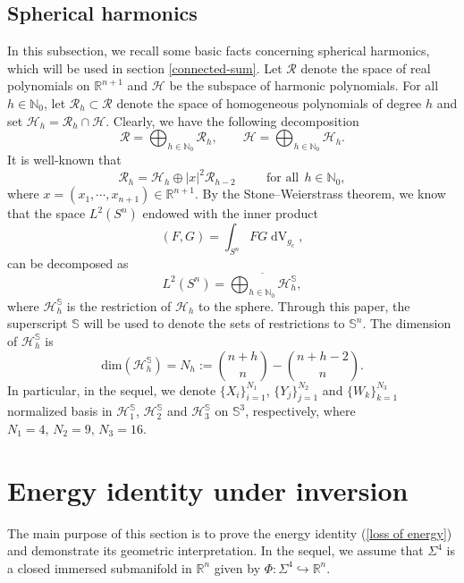 \documentclass[11pt,letterpaper]{amsart}
\DeclareMathOperator{\dvol}{dV}
\newcommand{\bN}{\mathbb{N}}
\newcommand{\bR}{\mathbb{R}}
\newcommand{\bS}{\mathbb{S}}
\theoremstyle{definition}
\theoremstyle{remark}
\numberwithin{equation}{section}
\begin{document}
\subsection{Spherical harmonics}
In  this subsection, we recall some basic facts concerning spherical harmonics, which will be used in section \ref{connected-sum}. Let $\mathcal{R}$ denote the space of real polynomials on $\bR^{n+1}$ and $\mathcal{H}$ be the subspace of harmonic polynomials. For all $h\in \bN_0$, let $\mathcal{R}_h\subset \mathcal{R}$ denote the space of homogeneous polynomials of degree $h$ and set $\mathcal{H}_h=\mathcal{R}_h\cap \mathcal{H}$. Clearly, we have the following decomposition
\begin{equation*}
    \mathcal{R}=\bigoplus_{h\in \bN_0}\mathcal{R}_h, \quad \quad \mathcal{H}=\bigoplus_{h\in \bN_0}\mathcal{H}_h.
\end{equation*}
It is well-known that 
\begin{equation}
    \mathcal{R}_h=\mathcal{H}_h\oplus |x|^2\mathcal{R}_{h-2} \quad \quad ~~\mbox{for all}~~ h\in \bN_0,
\end{equation}
where $x=(x_1,\cdots, x_{n+1})\in \bR^{n+1}$. 
By the Stone--Weierstrass theorem, we know that the space $L^2(S^{n})$ endowed with the inner product
\begin{equation*}
    (F,G)=\int_{S^{n}}FG\dvol_{g_c},
\end{equation*}
can be decomposed as 
\begin{equation*}
    L^2(S^{n})=\overline{\bigoplus_{h\in\bN_0}\mathcal{H}^{\bS}_{h}},
\end{equation*} 
where $\mathcal{H}^{\bS}_{h}$ is the restriction of $\mathcal{H}_{h}$ to the sphere. 
Through this paper, the superscript $\bS$ will be used to denote the sets of restrictions to $\mathbb{S}^{n}$. The dimension of $\mathcal{H}^{\bS}_{h}$ is 
\begin{equation*}
    \mathrm{dim} (\mathcal{H}^{\bS}_{h})=N_{h}:=\binom{n+h}{n}-\binom{n+h-2}{n}.
\end{equation*}
In particular, in the sequel, we denote $\{X_i\}_{i=1}^{N_1}$, $\{Y_j\}_{j=1}^{N_2}$ and $\{W_k\}_{k=1}^{N_3}$ normalized basis in $\mathcal{H}^{\bS}_{1}$, $\mathcal{H}^{\bS}_{2}$ and $\mathcal{H}^{\bS}_{3}$ on $\mathbb{S}^3$, respectively, where $ N_1=4, \, N_2=9, \, N_3=16.$


\section{Energy identity under inversion}\label{energy-identity}
The main purpose of this section is to prove the energy identity (\ref{loss of energy}) and demonstrate its geometric interpretation. In the sequel, we assume that $\Sigma^4$ is a closed immersed submanifold in $\bR^n$ given by $\Phi: \Sigma^4\hookrightarrow \bR^n$. 
\end{document}
